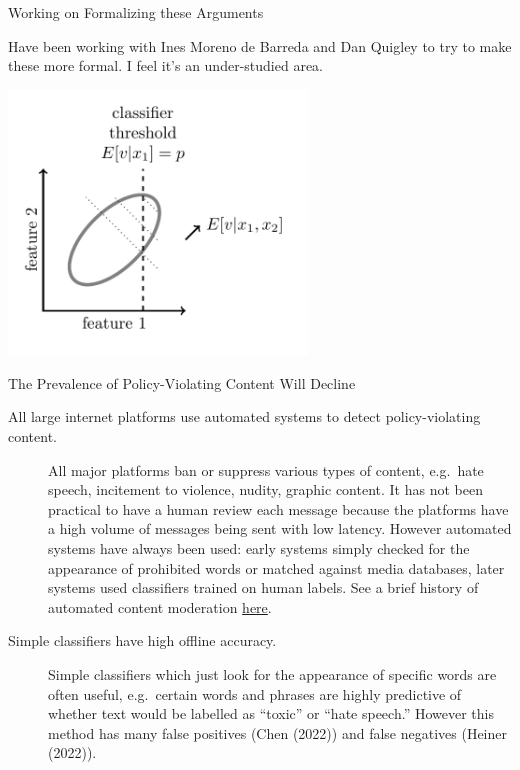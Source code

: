 \documentclass[
  10pt,
  ignorenonframetext,
]{beamer}
\providecommand{\tightlist}{%
  \setlength{\itemsep}{0pt}\setlength{\parskip}{0pt}}\usepackage{longtable,booktabs,array}
\begin{document}
\begin{frame}{Working on Formalizing these Arguments}
\label{working-on-formalizing-these-arguments}
\begin{description}
\tightlist
\item[Working on formalizing these arguments.]
Have been working with Ines Moreno de Barreda and Dan Quigley to try to
make these more formal. I feel it's an under-studied area.
\end{description}

\includegraphics[width=3.125in,height=\textheight]{images/2024-11-12-09-39-14.png}
\end{frame}

\begin{frame}{The Prevalence of Policy-Violating Content Will Decline}
\label{the-prevalence-of-policy-violating-content-will-decline}
\begin{description}
\item[All large internet platforms use automated systems to detect
policy-violating content.]
All major platforms ban or suppress various types of content, e.g.~hate
speech, incitement to violence, nudity, graphic content. It has not been
practical to have a human review each message because the platforms have
a high volume of messages being sent with low latency. However automated
systems have always been used: early systems simply checked for the
appearance of prohibited words or matched against media databases, later
systems used classifiers trained on human labels. See a brief history of
automated content moderation
\href{https://tecunningham.github.io/posts/2023-11-18-history-automated-text-moderation.html}{here}.
\item[Simple classifiers have high offline accuracy.]
Simple classifiers which just look for the appearance of specific words
are often useful, e.g.~certain words and phrases are highly predictive
of whether text would be labelled as ``toxic'' or ``hate speech.''
However this method has many false positives (Chen (2022)) and false
negatives (Heiner (2022)).
\end{description}
\end{frame}
\end{document}

